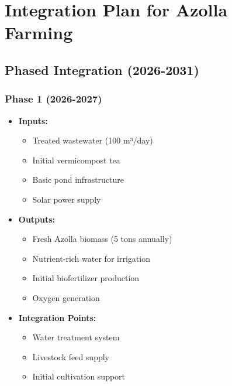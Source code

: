 \section{Integration Plan for Azolla Farming}

\subsection{Phased Integration (2026-2031)}

\subsubsection{Phase 1 (2026-2027)}
\begin{itemize}
    \item \textbf{Inputs:}
    \begin{itemize}
        \item Treated wastewater (100 m³/day)
        \item Initial vermicompost tea
        \item Basic pond infrastructure
        \item Solar power supply
    \end{itemize}
    \item \textbf{Outputs:}
    \begin{itemize}
        \item Fresh Azolla biomass (5 tons annually)
        \item Nutrient-rich water for irrigation
        \item Initial biofertilizer production
        \item Oxygen generation
    \end{itemize}
    \item \textbf{Integration Points:}
    \begin{itemize}
        \item Water treatment system
        \item Livestock feed supply
        \item Initial cultivation support
    \end{itemize}
\end{itemize}

